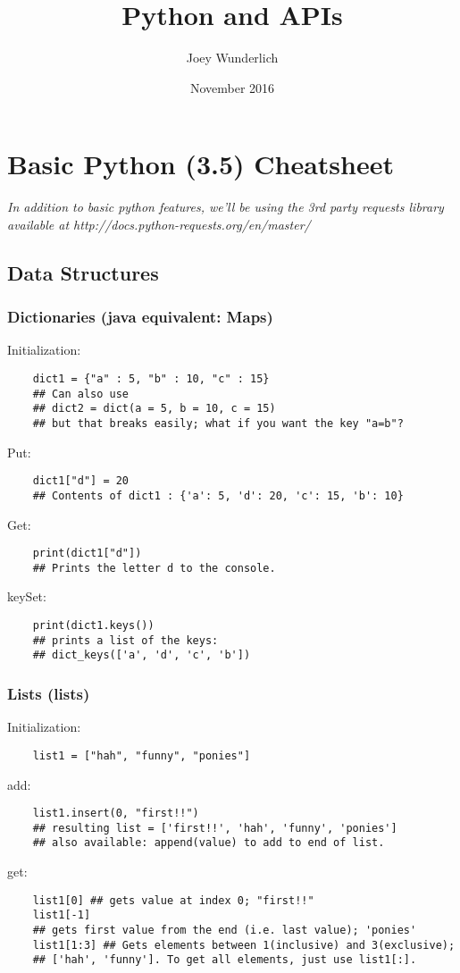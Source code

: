 \documentclass{article}
\title{Python and APIs}
\author{Joey Wunderlich}
\date{November 2016}
\begin{document}
\maketitle
\section{Basic Python (3.5) Cheatsheet}
\textit{In addition to basic python features, we'll be using the 3rd party requests library \\available at http://docs.python-requests.org/en/master/}

\subsection{Data Structures}
\subsubsection{Dictionaries (java equivalent: Maps)}
Initialization:
\begin{verbatim}
    dict1 = {"a" : 5, "b" : 10, "c" : 15}
    ## Can also use 
    ## dict2 = dict(a = 5, b = 10, c = 15)
    ## but that breaks easily; what if you want the key "a=b"?
\end{verbatim}
Put:
\begin{verbatim}
    dict1["d"] = 20
    ## Contents of dict1 : {'a': 5, 'd': 20, 'c': 15, 'b': 10}
\end{verbatim}
Get:
\begin{verbatim}
    print(dict1["d"])
    ## Prints the letter d to the console. 
\end{verbatim}
keySet:
\begin{verbatim}
    print(dict1.keys())
    ## prints a list of the keys:
    ## dict_keys(['a', 'd', 'c', 'b'])
\end{verbatim}

\subsubsection{Lists (lists)}
Initialization:
\begin{verbatim}
    list1 = ["hah", "funny", "ponies"]
\end{verbatim}
add:
\begin{verbatim}
    list1.insert(0, "first!!")
    ## resulting list = ['first!!', 'hah', 'funny', 'ponies']
    ## also available: append(value) to add to end of list.
\end{verbatim}
get:
\begin{verbatim}
    list1[0] ## gets value at index 0; "first!!"
    list1[-1]
    ## gets first value from the end (i.e. last value); 'ponies'
    list1[1:3] ## Gets elements between 1(inclusive) and 3(exclusive);
    ## ['hah', 'funny']. To get all elements, just use list1[:].
\end{verbatim}
\end{document}
